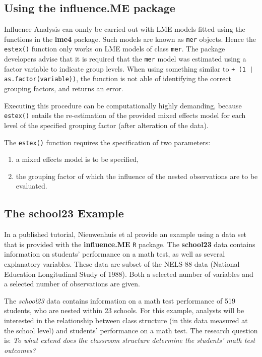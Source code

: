 \documentclass{article}
\begin{document}
\subsection*{Using the influence.ME package}
Influence Analysis can onnly be carried out with LME models fitted using the functions in the \textbf{lme4} package. Such models are known as \texttt{mer} objects.
Hence the \texttt{estex()} function only works on LME
models of class \texttt{mer}.
The package developers advise that it is required that the \texttt{mer} model was estimated using a factor variable to indicate group levels.
When using something similar to \texttt{+ (1 | as.factor(variable))}, the function is not able of
identifying the correct grouping factors, and returns an error.

Executing this procedure can be computationally highly demanding, because \texttt{estex()} entails the re-estimation of the provided mixed effects model for each level of the specified grouping factor (after alteration of the data).


The \texttt{estex()} function requires the specification of two parameters: 
\begin{enumerate}
\item a mixed effects model is to be specified,
\item the grouping factor of which the influence of the nested observations are to be evaluated. 
\end{enumerate}

\subsection*{ The school23 Example }
In a published tutorial, Nieuwenhuis et al provide an example using a data set that is provided with the \textbf{influence.ME} \texttt{R} package. The \textbf{school23} data contains information on students’ performance on a math test, as well as several
explanatory variables. These data are subset of the NELS-88 data (National Education Longitudinal
Study of 1988). Both a selected number of variables and a selected number of observations are given.


The \textit{school23} data contains information on a math test performance of 519 students, who are nested within 23 schools. For this example,  analysts will be interested in the relationship between class structure (in this data measured at the school level) and students’ performance on a math test. The research question is: \textit{To what extend does the classroom structure determine the students’ math test outcomes?}
\end{document}
